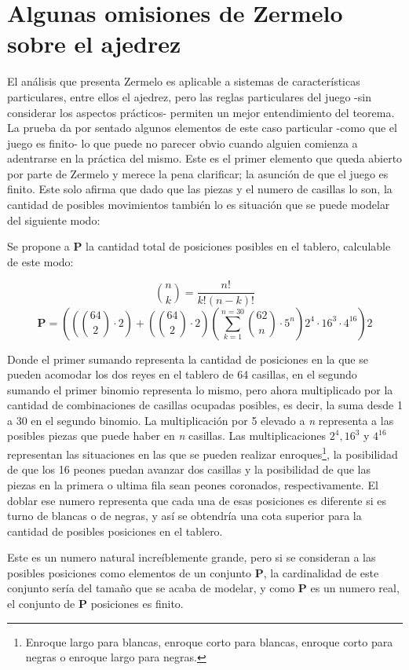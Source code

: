 \documentclass[twoside,openright,12pt,a4paper,spanish]{book}
\begin{document}
\section{Algunas omisiones de Zermelo sobre el ajedrez}
\noindent El análisis que presenta Zermelo es aplicable a sistemas de características particulares, entre ellos el ajedrez, pero las reglas particulares del juego -sin considerar los aspectos prácticos- permiten un mejor entendimiento del teorema. La prueba da por sentado algunos elementos de este caso particular -como que el juego es finito- lo que puede no parecer obvio cuando alguien comienza a adentrarse en la práctica del mismo. Este es el primer elemento que queda abierto por parte de Zermelo y merece la pena clarificar; la asunción de que el juego es finito. Este solo afirma que dado que las piezas y el numero de casillas lo son, la cantidad de posibles movimientos también lo es \cite{zermelo1913anwendung} situación que se puede modelar del siguiente modo:

Se propone a \textbf{P} la cantidad total de posiciones posibles en el tablero, calculable de este modo:

\[\binom{n}{k}=\frac{n!}{k!(n-k)!}\]
\[\textbf{P}=\left(\left(\binom{64}{2}\cdot2\right)+\left(\binom{64}{2}\cdot2\right)\left(\sum_{k=1}^{n=30}\binom{62}{n}\cdot5^{n}\right)2^{4}\cdot16^{3}\cdot4^{16}\right)2\]

Donde el primer sumando representa la cantidad de posiciones en la que se pueden acomodar los dos reyes en el tablero de 64 casillas, en el segundo sumando el primer binomio representa lo mismo, pero ahora multiplicado por la cantidad de combinaciones de casillas ocupadas posibles, es decir, la suma desde 1 a 30 en el segundo binomio. La multiplicación por 5 elevado a \textit{n} representa a las posibles piezas que puede haber en \textit{n} casillas. Las multiplicaciones $2^{4}, 16^{3}$ y $4^{16}$ representan las situaciones en las que se pueden realizar enroques\footnote{Enroque largo para blancas, enroque corto para blancas, enroque corto para negras o enroque largo para negras.}, la posibilidad de que los 16 peones puedan avanzar dos casillas y la posibilidad de que las piezas en la primera o ultima fila sean peones coronados, respectivamente. El doblar ese numero representa que cada una de esas posiciones es diferente si es turno de blancas o de negras, y así se obtendría una cota superior para la cantidad de posibles posiciones en el tablero.

Este es un numero natural increíblemente grande, pero si se consideran a las posibles posiciones como elementos de un conjunto \textbf{P}, la cardinalidad de este conjunto sería del tamaño que se acaba de modelar, y como \textbf{P} es un numero real, el conjunto de \textbf{P} posiciones es finito.
\end{document}
